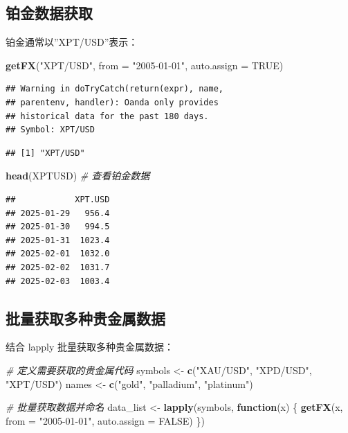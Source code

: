 \documentclass[]{ctexbook}
\newenvironment{Shaded}{\begin{snugshade}}{\end{snugshade}}
\newcommand{\AttributeTok}[1]{\textcolor[rgb]{0.13,0.29,0.53}{#1}}
\newcommand{\CommentTok}[1]{\textcolor[rgb]{0.56,0.35,0.01}{\textit{#1}}}
\newcommand{\ConstantTok}[1]{\textcolor[rgb]{0.56,0.35,0.01}{#1}}
\newcommand{\ControlFlowTok}[1]{\textcolor[rgb]{0.13,0.29,0.53}{\textbf{#1}}}
\newcommand{\FunctionTok}[1]{\textcolor[rgb]{0.13,0.29,0.53}{\textbf{#1}}}
\newcommand{\NormalTok}[1]{#1}
\newcommand{\OtherTok}[1]{\textcolor[rgb]{0.56,0.35,0.01}{#1}}
\newcommand{\StringTok}[1]{\textcolor[rgb]{0.31,0.60,0.02}{#1}}
\begin{document}
\subsection{铂金数据获取}\label{ux94c2ux91d1ux6570ux636eux83b7ux53d6}

铂金通常以''XPT/USD''表示：

\begin{Shaded}
\begin{Highlighting}[]
\FunctionTok{getFX}\NormalTok{(}\StringTok{"XPT/USD"}\NormalTok{, }\AttributeTok{from =} \StringTok{"2005{-}01{-}01"}\NormalTok{, }\AttributeTok{auto.assign =} \ConstantTok{TRUE}\NormalTok{)}
\end{Highlighting}
\end{Shaded}

\begin{verbatim}
## Warning in doTryCatch(return(expr), name,
## parentenv, handler): Oanda only provides
## historical data for the past 180 days.
## Symbol: XPT/USD
\end{verbatim}

\begin{verbatim}
## [1] "XPT/USD"
\end{verbatim}

\begin{Shaded}
\begin{Highlighting}[]
\FunctionTok{head}\NormalTok{(XPTUSD)  }\CommentTok{\# 查看铂金数据}
\end{Highlighting}
\end{Shaded}

\begin{verbatim}
##            XPT.USD
## 2025-01-29   956.4
## 2025-01-30   994.5
## 2025-01-31  1023.4
## 2025-02-01  1032.0
## 2025-02-02  1031.7
## 2025-02-03  1003.4
\end{verbatim}

\subsection{批量获取多种贵金属数据}\label{ux6279ux91cfux83b7ux53d6ux591aux79cdux8d35ux91d1ux5c5eux6570ux636e}

结合 lapply 批量获取多种贵金属数据：

\begin{Shaded}
\begin{Highlighting}[]
\CommentTok{\# 定义需要获取的贵金属代码}
\NormalTok{symbols }\OtherTok{\textless{}{-}} \FunctionTok{c}\NormalTok{(}\StringTok{"XAU/USD"}\NormalTok{, }\StringTok{"XPD/USD"}\NormalTok{, }\StringTok{"XPT/USD"}\NormalTok{)}
\NormalTok{names }\OtherTok{\textless{}{-}} \FunctionTok{c}\NormalTok{(}\StringTok{"gold"}\NormalTok{, }\StringTok{"palladium"}\NormalTok{, }\StringTok{"platinum"}\NormalTok{)}

\CommentTok{\# 批量获取数据并命名}
\NormalTok{data\_list }\OtherTok{\textless{}{-}} \FunctionTok{lapply}\NormalTok{(symbols, }\ControlFlowTok{function}\NormalTok{(x) \{}
  \FunctionTok{getFX}\NormalTok{(x, }\AttributeTok{from =} \StringTok{"2005{-}01{-}01"}\NormalTok{, }\AttributeTok{auto.assign =} \ConstantTok{FALSE}\NormalTok{)}
\NormalTok{\})}
\end{Highlighting}
\end{Shaded}
\end{document}

